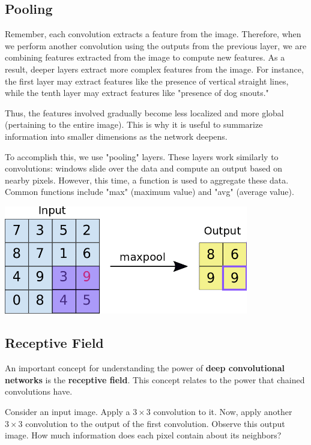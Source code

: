 \subsection{Pooling}

Remember, each convolution extracts a feature from the image. Therefore, when we perform another convolution using the outputs from the previous layer, we are combining features extracted from the image to compute new features. As a result, deeper layers extract more complex features from the image. For instance, the first layer may extract features like the presence of vertical straight lines, while the tenth layer may extract features like "presence of dog snouts."

Thus, the features involved gradually become less localized and more global (pertaining to the entire image). This is why it is useful to summarize information into smaller dimensions as the network deepens.

To accomplish this, we use "pooling" layers. These layers work similarly to convolutions: windows slide over the data and compute an output based on nearby pixels. However, this time, a function is used to aggregate these data. Common functions include "max" (maximum value) and "avg" (average value).

\begin{center}
\includegraphics[width=0.8\textwidth]{figuras/max_pool.png}
\end{center}

\subsection{Receptive Field}

An important concept for understanding the power of \textbf{deep convolutional networks} is the \textbf{receptive field}. This concept relates to the power that chained convolutions have.

Consider an input image. Apply a \( 3 \times 3 \) convolution to it. Now, apply another \( 3 \times 3 \) convolution to the output of the first convolution. Observe this output image. How much information does each pixel contain about its neighbors?

